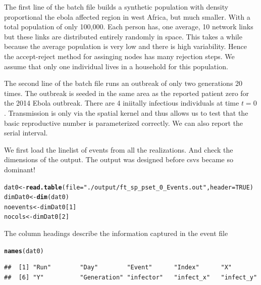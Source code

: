 \documentclass{article}\usepackage{graphicx, color}
\makeatletter
\newcommand{\hlfunctioncall}[1]{\textcolor[rgb]{0.501960784313725,0,0.329411764705882}{\textbf{#1}}}%
\newcommand{\hlstring}[1]{\textcolor[rgb]{0.6,0.6,1}{#1}}%
\newenvironment{kframe}{%
 \def\at@end@of@kframe{}%
 \ifinner\ifhmode%
  \def\at@end@of@kframe{\end{minipage}}%
  \begin{minipage}{\columnwidth}%
 \fi\fi%
 \def\FrameCommand##1{\hskip\@totalleftmargin \hskip-\fboxsep
 \colorbox{shadecolor}{##1}\hskip-\fboxsep
     \hskip-\linewidth \hskip-\@totalleftmargin \hskip\columnwidth}%
 \MakeFramed {\advance\hsize-\width
   \@totalleftmargin\z@ \linewidth\hsize
   \@setminipage}}%
 {\par\unskip\endMakeFramed%
 \at@end@of@kframe}
\newenvironment{knitrout}{}{} %
\makeatother
\begin{document}
The first line of the batch file builds a synthetic population with density
proportional the ebola affected region in west Africa, but much smaller. With a total population of only
100,000. Each person has, one average, 10 network links but these links are
distributed entirely randomly in space. This takes a while because the
average population is very low and there is high variability. Hence the
accept-reject method for assinging nodes has many rejection steps. We assume
that only one individual lives in a household for this population. 


The second line of the batch file runs an outbreak of only two generations 20
times. The outbreak is seeded in the same area as the reported patient zero for
the 2014 Ebola outbreak. There are 4 iniitally infectious individuals at time
$t=0$. Transmission is only via the spatial kernel and thus allows us to test
that the basic reproductive number is parameterized correctly. We can also
report the serial interval. 

%

We first load the linelist of events from all the realizations. And check the
dimensions of the output. The output was designed before csvs became so
dominant!

\begin{knitrout}
\color{fgcolor}\begin{kframe}
\begin{alltt}
dat0 <- \hlfunctioncall{read.table}(file=\hlstring{"./output/ft_sp_pset_0_Events.out"},header=TRUE)
dimDat0 <- \hlfunctioncall{dim}(dat0)
noevents <- dimDat0[1]
nocols <- dimDat0[2]
\end{alltt}
\end{kframe}
\end{knitrout}


The column headings describe the information captured in the event file
\begin{knitrout}
\color{fgcolor}\begin{kframe}
\begin{alltt}
\hlfunctioncall{names}(dat0)
\end{alltt}
\begin{verbatim}
##  [1] "Run"        "Day"        "Event"      "Index"      "X"         
##  [6] "Y"          "Generation" "infector"   "infect_x"   "infect_y"
\end{verbatim}
\end{kframe}
\end{knitrout}
\end{document}
